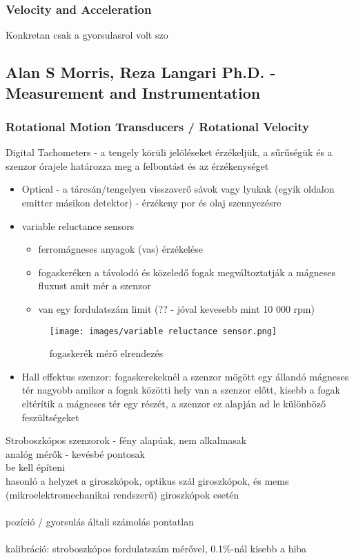 \documentclass{article}
\begin{document}
	
	\subsubsection {Velocity and Acceleration}
	Konkretan csak a gyorsulasrol volt szo
	
	\subsection{Alan S Morris, Reza Langari Ph.D. - Measurement and Instrumentation}
	
	\subsubsection{Rotational Motion Transducers / Rotational Velocity}
	
	Digital Tachometers - a tengely körüli jelöléseket érzékeljük, a sűrűségük és a szenzor órajele határozza meg a felbontást és az érzékenységet
	
	\begin{itemize}
		\item Optical - a tárcsán/tengelyen visszaverő sávok vagy lyukak (egyik oldalon emitter másikon detektor) - érzékeny por és olaj szennyezésre
		\item variable reluctance sensors
		\begin{itemize}
			\item ferromágneses anyagok (vas) érzékelése
			\item fogaskeréken a távolodó és közeledő fogak megváltoztatják a mágneses fluxust amit mér a szenzor
			\item van egy fordulatszám limit (?? - jóval kevesebb mint 10 000 rpm)
		\end{itemize}
		\begin{figure}[h]
			\caption{fogaskerék mérő elrendezés}
			\centering
			\texttt{[image: images/variable reluctance sensor.png]}
		\end{figure}
		\item Hall effektus szenzor:  fogaskerekeknél a szenzor mögött egy állandó mágneses tér nagyobb amikor a fogak közötti hely van a szenzor előtt, kisebb a fogak eltérítik a mágneses tér egy részét, a szenzor ez alapján ad le különböző feszültségeket
	\end{itemize}
	Stroboszkópos szenzorok - fény alapúak, nem alkalmasak \\
	analóg mérők - kevésbé pontosak\\
	be kell építeni\\
	hasonló a helyzet a giroszkópok, optikus szál giroszkópok, és mems (mikroelektromechanikai rendszerű) giroszkópok esetén\\
	\\
	pozíció / gyorsulás általi számolás pontatlan\\
	\\
	kalibráció: stroboszkópos fordulatszám mérővel, 0.1\%-nál kisebb a hiba\\
	
\end{document}
